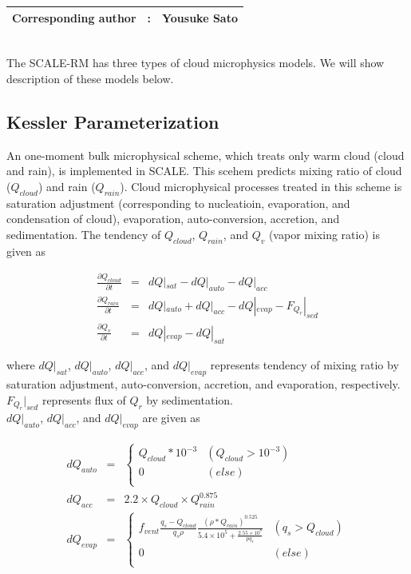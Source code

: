 {\bf \Large
\begin{tabular}{ccc}
\hline
  Corresponding author & : & Yousuke Sato\\
\hline
\end{tabular}
}
\\
 The SCALE-RM has three types of cloud microphysics models. We will show description of these models below.

\subsection{Kessler Parameterization}
An one-moment bulk microphysical scheme, which treats only warm cloud (cloud and rain), is implemented in SCALE. This scehem predicts mixing ratio of cloud ($Q_{cloud}$) and rain ($Q_{rain}$). Cloud microphysical processes treated in this scheme is saturation adjustment (corresponding to nucleatioin, evaporation, and condensation of cloud), evaporation, auto-conversion, accretion, and sedimentation. The tendency of $Q_{cloud}$, $Q_{rain}$, and $Q_{v}$ (vapor mixing ratio) is given as

\begin{eqnarray}
\frac{\partial Q_{cloud}}{\partial t}&=&dQ|_{sat}-dQ|_{auto}-dQ|_{acc}\\
\frac{\partial Q_{rain}}{\partial t}&=&dQ|_{auto}+dQ|_{acc}-dQ|_{evap}-F_{Q_{r}}|_{sed}\\
\frac{\partial Q_{v}}{\partial t}&=&dQ|_{evap}-dQ|_{sat}
\end{eqnarray}

where $dQ|_{sat}$, $dQ|_{auto}$, $dQ|_{acc}$, and $dQ|_{evap}$ represents tendency of mixing ratio by saturation adjustment, auto-conversion, accretion, and evaporation, respectively. $F_{Q_{r}}|_{sed}$ represents flux of $Q_{r}$ by sedimentation.\\ $dQ|_{auto}$, $dQ|_{acc}$, and $dQ|_{evap}$ are given as

\begin{eqnarray}
dQ_{auto}&=&\left\{
\begin{array}{ll}
Q_{cloud}*10^{-3} & (Q_{cloud}>10^{-3})\\
0 & (else)\\
\end{array}\right.\\
dQ_{acc}&=&2.2\times Q_{cloud}\times Q_{rain}^{0.875}\\
dQ_{evap}&=&\left\{
\begin{array}{ll}
f_{vent} \frac{q_{s}-Q_{cloud}}{q_{s}\rho}\frac{(\rho*Q_{rain})^{0.525}}{5.4\times 10^{5}+\frac{2.55\times 10^{8}}{pq_{s}}} & ( q_{s} > Q_{cloud})\\
0 & (else)\\
\end{array} \right.
\end{eqnarray}

